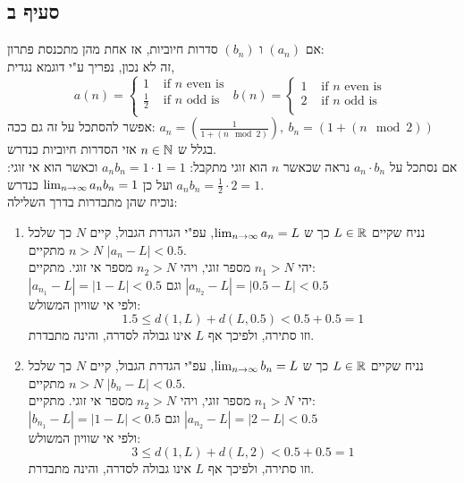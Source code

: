 \documentclass{article}
\begin{document}
\subsection*{סעיף ב}
אם $(a_n)$ ו $(b_n)$ סדרות חיוביות, אז אחת מהן מתכנסת
פתרון: \\
זה לא נכון, נפריך ע"י דוגמא נגדית,
\[
	a(n) =
	\begin{cases}
		1 & \text{ if  } n \text{ even is } \\
		\frac{1}{2} & \text{ if  } n \text{ odd is } \\
	\end{cases}
	b(n) =
	\begin{cases}
		1 & \text{ if  } n \text{ even is } \\
		2 & \text{ if  } n \text{ odd is } \\
	\end{cases}
\]
אפשר להסתכל על זה גם ככה: $a_n = (\frac{1}{1 + (n \mod 2)}),\  b_n = (1 + (n \mod 2))$ \\
בגלל ש $n \in \mathbb{N}$ אזי הסדרות חיוביות כנדרש. \\
אם נסתכל על $a_n \cdot b_n$ נראה שכאשר $n$ הוא זוגי מתקבל: $a_n b_n = 1 \cdot 1 = 1$ וכאשר הוא אי זוגי: $a_n b_n = \frac{1}{2} \cdot 2 = 1$
ועל כן $\lim_{n \to \infty} a_n b_n = 1$ כנדרש.
\\
נוכיח שהן מתבדרות בדרך השלילה:
\begin{enumerate}
	\item נניח שקיים $L \in \mathbb{R}$ כך ש $\lim_{n \to \infty} a_n = L$, עפ"י הגדרת הגבול, קיים $N$ כך שלכל $n > N$ מתקיים
	$|a_n - L| < 0.5$. \\
יהי $n_1 > N$ מספר זוגי, ויהי $n_2 > N$ מספר אי זוגי.
	מתקיים: \\
	$|a_{n_1} - L| = |1 - L| < 0.5$ וגם $|a_{n_2} - L| = |0.5 - L| < 0.5$ \\
	ולפי אי שוויון המשולש:
	\[ 1.5 \leq d(1, L) + d(L, 0.5) < 0.5+0.5=1 \]
	וזו סתירה, ולפיכך אף $L$ אינו גבולה לסדרה, והינה מתבדרת.

	\item נניח שקיים $L \in \mathbb{R}$ כך ש $\lim_{n \to \infty} b_n = L$, עפ"י הגדרת הגבול, קיים $N$ כך שלכל $n > N$ מתקיים
	$|b_n - L| < 0.5$. \\
יהי $n_1 > N$ מספר זוגי, ויהי $n_2 > N$ מספר אי זוגי.
	מתקיים: \\
	$|b_{n_1} - L| = |1 - L| < 0.5$ וגם $|a_{n_2} - L| = |2 - L| < 0.5$ \\
	ולפי אי שוויון המשולש:
	\[ 3 \leq d(1, L) + d(L, 2) < 0.5+0.5=1 \]
	וזו סתירה, ולפיכך אף $L$ אינו גבולה לסדרה, והינה מתבדרת.
\end{enumerate}
\end{document}

